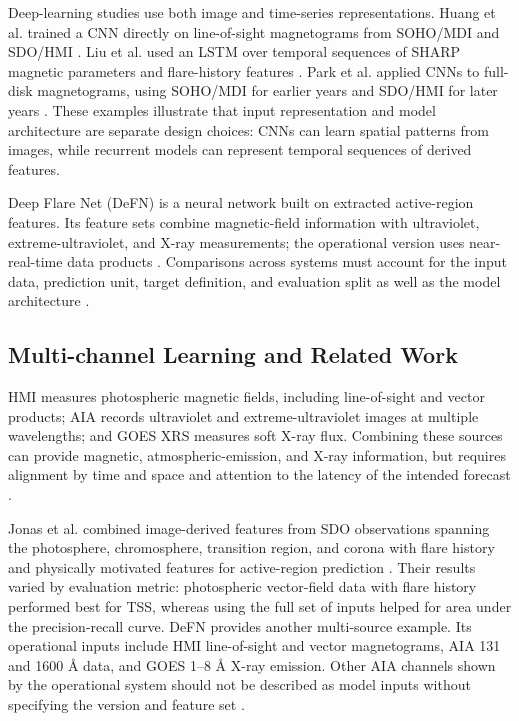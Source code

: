 \documentclass[12pt]{report}
\begin{document}
Deep-learning studies use both image and time-series representations. Huang et al. trained a CNN directly on line-of-sight magnetograms from SOHO/MDI and SDO/HMI \citep{huang2018flarelos}. Liu et al. used an LSTM over temporal sequences of SHARP magnetic parameters and flare-history features \citep{liu2019flarelstm}. Park et al. applied CNNs to full-disk magnetograms, using SOHO/MDI for earlier years and SDO/HMI for later years \citep{park2018fulldiskcnn}. These examples illustrate that input representation and model architecture are separate design choices: CNNs can learn spatial patterns from images, while recurrent models can represent temporal sequences of derived features.

Deep Flare Net (DeFN) is a neural network built on extracted active-region features. Its feature sets combine magnetic-field information with ultraviolet, extreme-ultraviolet, and X-ray measurements; the operational version uses near-real-time data products \citep{nishizuka2018defn,nishizuka2021defn}. Comparisons across systems must account for the input data, prediction unit, target definition, and evaluation split as well as the model architecture \citep{barnes2016comparison,cinto2020framework}.

\subsection{Multi-channel Learning and Related Work}

HMI measures photospheric magnetic fields, including line-of-sight and vector products; AIA records ultraviolet and extreme-ultraviolet images at multiple wavelengths; and GOES XRS measures soft X-ray flux. Combining these sources can provide magnetic, atmospheric-emission, and X-ray information, but requires alignment by time and space and attention to the latency of the intended forecast \citep{nasa_sdo_instruments}.

Jonas et al. combined image-derived features from SDO observations spanning the photosphere, chromosphere, transition region, and corona with flare history and physically motivated features for active-region prediction \citep{jonas2018flare}. Their results varied by evaluation metric: photospheric vector-field data with flare history performed best for TSS, whereas using the full set of inputs helped for area under the precision-recall curve. DeFN provides another multi-source example. Its operational inputs include HMI line-of-sight and vector magnetograms, AIA 131 and 1600 \AA{} data, and GOES 1--8 \AA{} X-ray emission. Other AIA channels shown by the operational system should not be described as model inputs without specifying the version and feature set \citep{nishizuka2018defn,nishizuka2021defn}.
\end{document}
